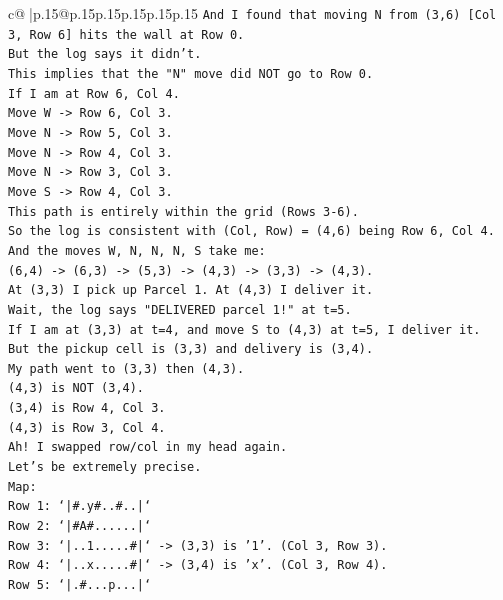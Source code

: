 \documentclass{article}
\begin{document}
{\begin{supertabular}{c@{$\;$}|p{.15\linewidth}@{}p{.15\linewidth}p{.15\linewidth}p{.15\linewidth}p{.15\linewidth}p{.15\linewidth}}
{{{\texttt{And I found that moving N from (3,6) {[}Col 3, Row 6{]} hits the wall at Row 0.} \\
\texttt{But the log says it didn't.} \\
\texttt{This implies that the "N" move did NOT go to Row 0.} \\
\texttt{If I am at Row 6, Col 4.} \\
\texttt{Move W {-}> Row 6, Col 3.} \\
\texttt{Move N {-}> Row 5, Col 3.} \\
\texttt{Move N {-}> Row 4, Col 3.} \\
\texttt{Move N {-}> Row 3, Col 3.} \\
\texttt{Move S {-}> Row 4, Col 3.} \\
\texttt{This path is entirely within the grid (Rows 3{-}6).} \\
\texttt{So the log is consistent with (Col, Row) = (4,6) being Row 6, Col 4.} \\
\texttt{And the moves W, N, N, N, S take me:} \\
\texttt{(6,4) {-}> (6,3) {-}> (5,3) {-}> (4,3) {-}> (3,3) {-}> (4,3).} \\
\texttt{At (3,3) I pick up Parcel 1. At (4,3) I deliver it.} \\
\texttt{Wait, the log says "DELIVERED parcel 1!" at t=5.} \\
\texttt{If I am at (3,3) at t=4, and move S to (4,3) at t=5, I deliver it.} \\
\texttt{But the pickup cell is (3,3) and delivery is (3,4).} \\
\texttt{My path went to (3,3) then (4,3).} \\
\texttt{(4,3) is NOT (3,4).} \\
\texttt{(3,4) is Row 4, Col 3.} \\
\texttt{(4,3) is Row 3, Col 4.} \\
\texttt{Ah! I swapped row/col in my head again.} \\
\texttt{Let's be extremely precise.} \\
\texttt{Map:} \\
\texttt{Row 1: `|\#.y\#..\#..|`} \\
\texttt{Row 2: `|\#A\#......|`} \\
\texttt{Row 3: `|..1.....\#|` {-}> (3,3) is '1'. (Col 3, Row 3).} \\
\texttt{Row 4: `|..x.....\#|` {-}> (3,4) is 'x'. (Col 3, Row 4).} \\
\texttt{Row 5: `|.\#...p...|`} \\
}}}
\end{supertabular}}
\end{document}
